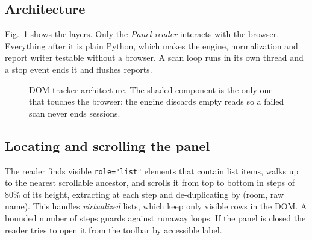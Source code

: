 \documentclass[conference]{IEEEtran}
\begin{document}
\subsection{Architecture}
Fig.~\ref{fig:arch} shows the layers. Only the \emph{Panel reader} interacts with the browser. Everything after it is plain Python, which makes the engine, normalization and report writer testable without a browser. A scan loop runs in its own thread and a stop event ends it and flushes reports.

\begin{figure}[t]
\centering
{}
\caption{DOM tracker architecture. The shaded component is the only one that touches the browser; the engine discards empty reads so a failed scan never ends sessions.}
\label{fig:arch}
\end{figure}

\subsection{Locating and scrolling the panel}
The reader finds visible \texttt{role="list"} elements that contain list items, walks up to the nearest scrollable ancestor, and scrolls it from top to bottom in steps of 80\% of its height, extracting at each step and de-duplicating by (room, raw name). This handles \emph{virtualized} lists, which keep only visible rows in the DOM. A bounded number of steps guards against runaway loops. If the panel is closed the reader tries to open it from the toolbar by accessible label.
\end{document}
